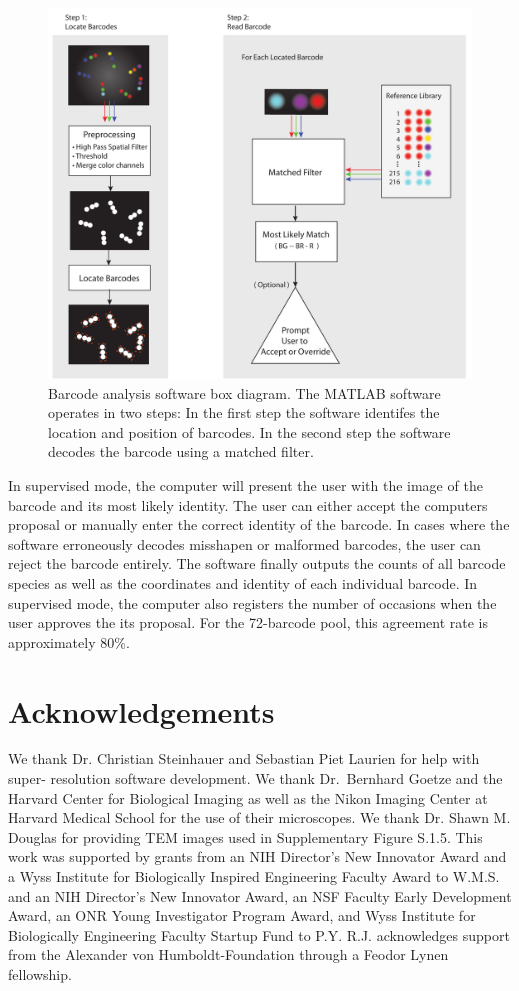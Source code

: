 \begin{figure}
\includegraphics[width=\textwidth]{figures/dna_MatlabBlockDiagram}
\caption[Barcode anlaysis software]{
 Barcode analysis software box diagram. The MATLAB software operates in two steps: In the first step the software identifes the
location and position of barcodes. In the second step the software decodes the barcode  using a matched filter. 
\label{fig:dna_MatlabBlockDiagram}}
\end{figure}


In supervised mode, the computer will present the user with the image of the barcode and its most likely identity. The user can either accept the computers proposal or manually enter the correct identity of the barcode. In cases where the software erroneously decodes misshapen or malformed barcodes, the user can reject the barcode entirely. The software finally outputs the counts of all barcode species as well as the coordinates and identity of each individual barcode. In supervised mode, the computer also registers the number of occasions when the user approves the its proposal. For the 72-barcode pool, this agreement rate is approximately 80\%.

\section{Acknowledgements}
We thank Dr. Christian Steinhauer and Sebastian Piet Laurien for help with super- 
resolution software development. We thank Dr.~Bernhard Goetze and the Harvard Center 
for Biological Imaging as well as the Nikon Imaging Center at Harvard Medical School 
for the use of their microscopes. We thank Dr. Shawn M. Douglas for providing TEM 
images used in Supplementary Figure S.1.5. This work was supported by grants from an NIH Director’s New 
Innovator Award and a Wyss Institute for Biologically Inspired Engineering Faculty 
Award to W.M.S. and an NIH Director’s New Innovator Award, an NSF Faculty Early 
Development Award, an ONR Young Investigator Program Award, and Wyss Institute 
for Biologically Engineering Faculty Startup Fund to P.Y. R.J. acknowledges support 
from the Alexander von Humboldt-Foundation through a Feodor Lynen fellowship.


